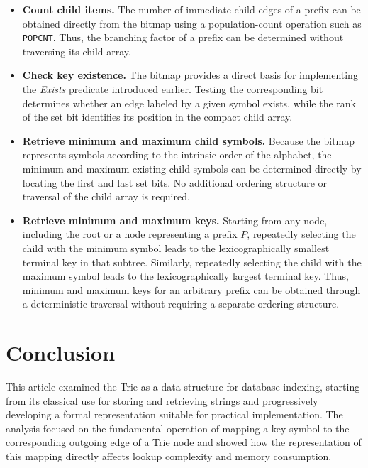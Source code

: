 \documentclass[pdflatex,sn-mathphys-num]{sn-jnl}%
\theoremstyle{thmstyleone}%
\theoremstyle{thmstyletwo}%
\theoremstyle{thmstylethree}%
\begin{document}
\begin{itemize}
\item \textbf{Count child items.}
The number of immediate child edges of a prefix can be obtained directly from the bitmap using a population-count
operation such as \texttt{POPCNT}. Thus, the branching factor of a prefix can be determined without traversing
its child array.
\item \textbf{Check key existence.}
The bitmap provides a direct basis for implementing the \textit{Exists} predicate introduced earlier.
Testing the corresponding bit determines whether an edge labeled by a given symbol exists, while the rank of the
set bit identifies its position in the compact child array.

\item \textbf{Retrieve minimum and maximum child symbols.}
Because the bitmap represents symbols according to the intrinsic order of the alphabet, the minimum and maximum
existing child symbols can be determined directly by locating the first and last set bits. No additional ordering
structure or traversal of the child array is required.

\item \textbf{Retrieve minimum and maximum keys.}
Starting from any node, including the root or a node representing a prefix $P$, repeatedly selecting the child with
the minimum symbol leads to the lexicographically smallest terminal key in that subtree.
Similarly, repeatedly selecting the child with the maximum symbol leads to the lexicographically largest terminal key.
Thus, minimum and maximum keys for an arbitrary prefix can be obtained through a deterministic traversal without
requiring a separate ordering structure.

\end{itemize}


\section{Conclusion}
\label{conclusion}

This article examined the Trie as a data structure for database indexing, starting from its classical use for
storing and retrieving strings and progressively developing a formal representation suitable for practical
implementation. The analysis focused on the fundamental operation of mapping a key symbol to the corresponding
outgoing edge of a Trie node and showed how the representation of this mapping directly affects lookup
complexity and memory consumption.
\end{document}
